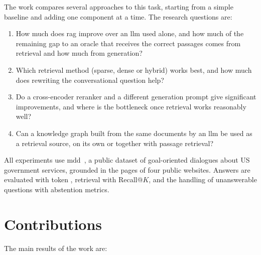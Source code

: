 The work compares several approaches to this task, starting from a simple baseline and
adding one component at a time. The research questions are:

\begin{enumerate}
    \item How much does \gls{rag} improve over an \gls{llm} used alone, and how much of
          the remaining gap to an oracle that receives the correct passages comes from
          retrieval and how much from generation?

    \item Which retrieval method (sparse, dense or hybrid) works best, and how much does
          rewriting the conversational question help?

    \item Do a cross-encoder reranker and a different generation prompt give significant
          improvements, and where is the bottleneck once retrieval works reasonably well?

    \item Can a knowledge graph built from the same documents by an \gls{llm} be used as
          a retrieval source, on its own or together with passage retrieval?
\end{enumerate}

All experiments use \gls{mdd}~\cite{feng2021multidoc2dial}, a public dataset of
goal-oriented dialogues about US government services, grounded in the pages of four
public websites. Answers are evaluated with token \fone{}, retrieval with Recall@$K$,
and the handling of unanswerable questions with abstention metrics.

\section*{Contributions}

The main results of the work are:

